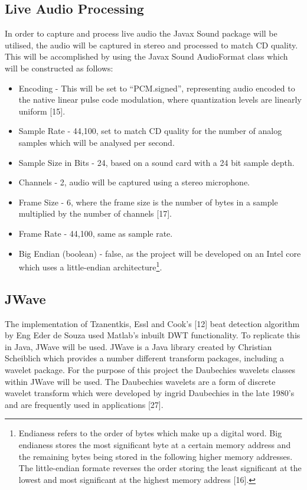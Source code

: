 \documentclass[a4paper, 11pt]{article}
\begin{document}
\subsection{Live Audio Processing}
In order to capture and process live audio the Javax Sound package will be utilised, the audio will be captured in stereo and processed to match CD quality. This will be accomplished by using the Javax Sound AudioFormat class which will be constructed as follows:

\begin{itemize}
\item Encoding - This will be set to ``PCM.signed'', representing audio encoded to the native linear pulse code modulation, where quantization levels are linearly uniform [15].
\item Sample Rate - 44,100, set to match CD quality for the number of analog samples which will be analysed per second. 
\item Sample Size in Bits - 24, based on a sound card with a 24 bit sample depth.
\item Channels - 2, audio will be captured using a stereo microphone.
\item Frame Size - 6, where the frame size is the number of bytes in a sample multiplied by the number of channels [17].
\item Frame Rate - 44,100, same as sample rate.
\item Big Endian (boolean) - false, as the project will be developed on an Intel core which uses a little-endian architecture\footnote{Endianess refers to the order of bytes which make up a digital word. Big endianess stores the most significant byte at a certain memory address and the remaining bytes being stored in the following higher memory addresses. The little-endian formate reverses the order storing the least significant at the lowest and most significant at the highest memory address [16].}.
\end{itemize}

\subsection{JWave}
The implementation of Tzanentkis, Essl and Cook's [12] beat detection algorithm by Eng Eder de Souza used Matlab's inbuilt DWT functionality. To replicate this in Java, JWave will be used. JWave is a Java library created by Christian Scheiblich which provides a number different transform packages, including a wavelet package. For the purpose of this project the Daubechies wavelets classes within JWave will be used. The Daubechies wavelets are a form of discrete wavelet transform which were developed by ingrid Daubechies in the late 1980's and are frequently used in applications [27]. 
\end{document}
